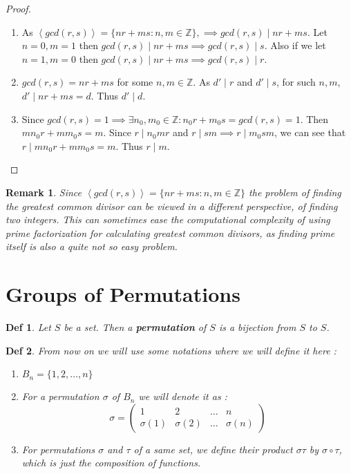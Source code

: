 \documentclass[paper=a4, fontsize=11pt]{scrartcl}
\newcommand{\cyc}[1]{\left< #1 \right>}
\newcommand{\nextline}{$ $ \newline \vspace{-0.15in}}
\newtheorem{definition}{Def}
\newtheorem*{remark}{Remark}
\begin{document}
\begin{proof}
\nextline
\begin{enumerate}
	\item As $\cyc{gcd(r,s)}=\{nr+ms : n,m\in \mathbb{Z} \} , \implies gcd(r,s) \mid nr+ms$. Let $n=0 , m=1$ then $gcd(r,s) \mid nr+ms \implies gcd(r,s) \mid s$. Also if we let $n=1, m=0$ then $gcd(r,s) \mid nr+ms \implies gcd(r,s) \mid r$.
	\item $gcd(r,s)=nr+ms$ for some $n,m \in \mathbb{Z}$. As $d' \mid r$ and $d' \mid s$, for such $n,m$, $d' \mid nr+ms =d$. Thus $d' \mid d$.
	\item Since $gcd(r,s)=1 \implies \exists n_0 , m_0 \in \mathbb{Z}: n_0 r + m_0 s = gcd(r,s)=1$. Then $mn_0 r + mm_0 s =m$. Since $r \mid n_0 m r$ and $r \mid sm \implies r\mid m_0 sm$, we can see that $r \mid mn_0 r + mm_0 s = m$. Thus $r \mid m$.
\end{enumerate}
\end{proof}

\begin{remark}
	Since  $\cyc{gcd(r,s)}=\{nr+ms : n,m\in \mathbb{Z} \} $ the problem of finding the greatest common divisor can be viewed in a different perspective, of finding two integers. This can sometimes ease the computational complexity of using prime factorization for calculating greatest common divisors, as finding prime itself is also a quite not so easy problem.
\end{remark}


\vspace{0.25in}
\section{Groups of Permutations}
\vspace{0.25in}

\begin{definition}
	Let $S$ be a set. Then a \textbf{permutation} of $S$ is a bijection from $S$ to $S$.
\end{definition}

\begin{definition}
	From now on we will use some notations where we will define it here :
	\begin{enumerate}[label=(\arabic*)]
		\item $B_n = \{ 1, 2, \dots , n\}$
		\item For a permutation $\sigma$ of $B_n$ we will denote it as :
		\begin{equation}\nonumber
			\sigma = 
			\begin{pmatrix}
			 1 & 2 & \dots & n \\
			 \sigma(1) & \sigma(2) & \dots & \sigma(n) 
			\end{pmatrix}
		\end{equation}
		\item For permutations $\sigma$ and $\tau$ of a same set, we define their product $\sigma\tau$ by $\sigma \circ \tau$, which is just the composition of functions.\\
	\end{enumerate}
\end{definition}
\end{document}
